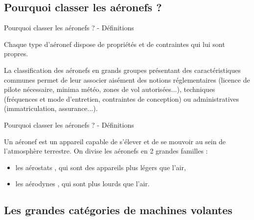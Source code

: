 \subsection{Pourquoi classer les aéronefs ?}
\begin{frame}{Pourquoi classer les aéronefs ? - Définitions}

Chaque type d'aéronef dispose de propriétés et de contraintes qui lui sont propres. 

La classification des aéronefs en grands groupes présentant des caractéristiques communes permet de leur associer aisément des notions réglementaires (licence de pilote nécessaire, minima météo, zones de vol autorisées...), techniques (fréquences et mode d'entretien, contraintes de conception) ou administratives (immatriculation, assurance...).
\end{frame}

\begin{frame}{Pourquoi classer les aéronefs ? - Définitions}

Un aéronef  est un appareil capable de s'élever et de se mouvoir au sein de l'atmosphère terrestre. \pause On divise les aéronefs en 2 grandes familles : \pause
\begin{itemize}
	\item les  aérostats , qui sont des appareils plus légers que l'air,
	\pause
	\item les  aérodynes , qui sont plus lourds que l'air.
\end{itemize}
\end{frame}

\subsection{Les grandes catégories de machines volantes}

